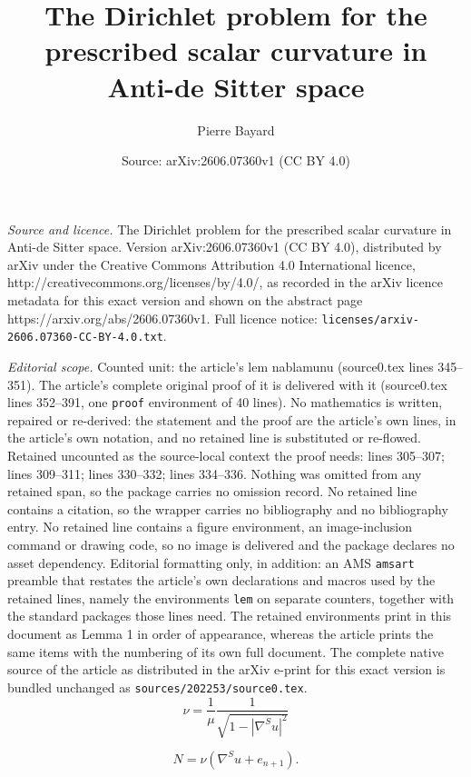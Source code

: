 \documentclass[10pt,a4paper]{amsart}
\title{The Dirichlet problem for the prescribed scalar curvature in Anti-de Sitter space}
\author{Pierre Bayard}
\date{Source: arXiv:2606.07360v1 (CC BY 4.0)}
\begin{document}
\maketitle

\noindent\emph{Source and licence.} The Dirichlet problem for the prescribed scalar curvature in Anti-de Sitter space. Version arXiv:2606.07360v1 (CC BY 4.0), distributed by arXiv under the Creative Commons Attribution 4.0 International licence, http://creativecommons.org/licenses/by/4.0/, as recorded in the arXiv licence metadata for this exact version and shown on the abstract page https://arxiv.org/abs/2606.07360v1. Full licence notice: \texttt{licenses/arxiv-2606.07360-CC-BY-4.0.txt}.\par\smallskip

\noindent\textit{Editorial scope.} Counted unit: the article's lem nablamunu (source0.tex lines 345--351). The article's complete original proof of it is delivered with it (source0.tex lines 352--391, one \texttt{proof} environment of 40 lines). No mathematics is written, repaired or re-derived: the statement and the proof are the article's own lines, in the article's own notation, and no retained line is substituted or re-flowed.  Retained uncounted as the source-local context the proof needs: lines 305--307; lines 309--311; lines 330--332; lines 334--336.  Nothing was omitted from any retained span, so the package carries no omission record.  No retained line contains a citation, so the wrapper carries no bibliography and no bibliography entry.  No retained line contains a figure environment, an image-inclusion command or drawing code, so no image is delivered and the package declares no asset dependency.  Editorial formatting only, in addition: an AMS \texttt{amsart} preamble that restates the article's own declarations and macros used by the retained lines, namely the environments \texttt{lem} on separate counters, together with the standard packages those lines need.  The retained environments print in this document as Lemma 1 in order of appearance, whereas the article prints the same items with the numbering of its own full document.  The complete native source of the article as distributed in the arXiv e-print for this exact version is bundled unchanged as \texttt{sources/202253/source0.tex}.
\begin{equation}\label{notation est C1 expr nu}
\nu=\frac{1}{\mu}\frac{1}{\sqrt{1-|\nabla^Su|^2}}
\end{equation}

\begin{equation}\label{notation est C1 expr N}
N=\nu\left(\nabla^Su+e_{n+1}\right).
\end{equation}
\end{document}
